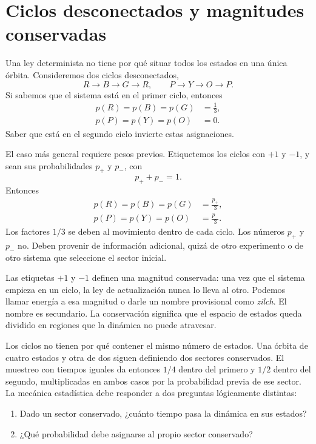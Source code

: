 \section{Ciclos desconectados y magnitudes conservadas}

Una ley determinista no tiene por qué situar todos los estados en una única órbita. Consideremos dos ciclos desconectados,
\begin{equation}
 R\longrightarrow B\longrightarrow G\longrightarrow R,
 \qquad
 P\longrightarrow Y\longrightarrow O\longrightarrow P.
 \label{eq:sm1-two-cycles}
\end{equation}
Si sabemos que el sistema está en el primer ciclo, entonces
\begin{equation}
 \begin{aligned}
 p(R)=p(B)=p(G)&=\frac13,\\
 p(P)=p(Y)=p(O)&=0.
 \end{aligned}
\end{equation}
Saber que está en el segundo ciclo invierte estas asignaciones.

El caso más general requiere pesos previos. Etiquetemos los ciclos con \(+1\) y \(-1\), y sean sus probabilidades \(p_+\) y \(p_-\), con
\begin{equation}
 p_++p_-=1.
\end{equation}
Entonces
\begin{align}
 p(R)=p(B)=p(G)&=\frac{p_+}{3},\\
 p(P)=p(Y)=p(O)&=\frac{p_-}{3}.
 \label{eq:sm1-sector-weights}
\end{align}
Los factores \(1/3\) se deben al movimiento dentro de cada ciclo. Los números \(p_+\) y \(p_-\) no. Deben provenir de información adicional, quizá de otro experimento o de otro sistema que seleccione el sector inicial.

Las etiquetas \(+1\) y \(-1\) definen una magnitud conservada: una vez que el sistema empieza en un ciclo, la ley de actualización nunca lo lleva al otro. Podemos llamar energía a esa magnitud o darle un nombre provisional como \emph{zilch}. El nombre es secundario. La conservación significa que el espacio de estados queda dividido en regiones que la dinámica no puede atravesar.

Los ciclos no tienen por qué contener el mismo número de estados. Una órbita de cuatro estados y otra de dos siguen definiendo dos sectores conservados. El muestreo con tiempos iguales da entonces \(1/4\) dentro del primero y \(1/2\) dentro del segundo, multiplicadas en ambos casos por la probabilidad previa de ese sector. La mecánica estadística debe responder a dos preguntas lógicamente distintas:
\begin{enumerate}
\item Dado un sector conservado, ¿cuánto tiempo pasa la dinámica en sus estados?
\item ¿Qué probabilidad debe asignarse al propio sector conservado?
\end{enumerate}

